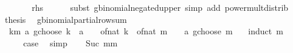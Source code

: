 \begin{isabellebody}
\ \ \isamarkupfalse%
\ \isamarkupfalse%
\ {\isachardoublequoteopen}{\isasymdots}\ {\isacharequal}{\kern0pt}\ {\isacharquery}{\kern0pt}rhs{\isachardoublequoteclose}\isanewline
\ \ \ \ \isamarkupfalse%
\ {\isacharparenleft}{\kern0pt}subst\ gbinomial{\isacharunderscore}{\kern0pt}negated{\isacharunderscore}{\kern0pt}upper{\isacharparenright}{\kern0pt}\ {\isacharparenleft}{\kern0pt}simp\ add{\isacharcolon}{\kern0pt}\ power{\isacharunderscore}{\kern0pt}mult{\isacharunderscore}{\kern0pt}distrib{\isacharparenright}{\kern0pt}\isanewline
\ \ \isamarkupfalse%
\ \isamarkupfalse%
\ {\isacharquery}{\kern0pt}thesis\ \isacommand{{\isachardot}{\kern0pt}}\isamarkupfalse%
\isanewline
{}\isamarkupfalse%
%
\endisatagproof
{\isafoldproof}%
%
\isadelimproof
\isanewline
%
\endisadelimproof
\isanewline
{}\isamarkupfalse%
\ gbinomial{\isacharunderscore}{\kern0pt}partial{\isacharunderscore}{\kern0pt}row{\isacharunderscore}{\kern0pt}sum{\isacharcolon}{\kern0pt}\isanewline
\ \ {\isachardoublequoteopen}{\isacharparenleft}{\kern0pt}{\isasymSum}k{\isasymle}m{\isachardot}{\kern0pt}\ {\isacharparenleft}{\kern0pt}a\ gchoose\ k{\isacharparenright}{\kern0pt}\ {\isacharasterisk}{\kern0pt}\ {\isacharparenleft}{\kern0pt}{\isacharparenleft}{\kern0pt}a\ {\isacharslash}{\kern0pt}\ {}{\isacharparenright}{\kern0pt}\ {\isacharminus}{\kern0pt}\ of{\isacharunderscore}{\kern0pt}nat\ k{\isacharparenright}{\kern0pt}{\isacharparenright}{\kern0pt}\ {\isacharequal}{\kern0pt}\ {\isacharparenleft}{\kern0pt}{\isacharparenleft}{\kern0pt}of{\isacharunderscore}{\kern0pt}nat\ m\ {\isacharplus}{\kern0pt}\ {}{\isacharparenright}{\kern0pt}{\isacharslash}{\kern0pt}{}{\isacharparenright}{\kern0pt}\ {\isacharasterisk}{\kern0pt}\ {\isacharparenleft}{\kern0pt}a\ gchoose\ {\isacharparenleft}{\kern0pt}m\ {\isacharplus}{\kern0pt}\ {}{\isacharparenright}{\kern0pt}{\isacharparenright}{\kern0pt}{\isachardoublequoteclose}\isanewline
%
\isadelimproof
%
\endisadelimproof
%
\isatagproof
{}\isamarkupfalse%
\ {\isacharparenleft}{\kern0pt}induct\ m{\isacharparenright}{\kern0pt}\isanewline
\ \ \isamarkupfalse%
\ {}\isanewline
\ \ \isamarkupfalse%
\ \isamarkupfalse%
\ {\isacharquery}{\kern0pt}case\ \isamarkupfalse%
\ simp\isanewline
{}\isamarkupfalse%
\isanewline
\ \ \isamarkupfalse%
\ {\isacharparenleft}{\kern0pt}Suc\ mm{\isacharparenright}{\kern0pt}\isanewline

\end{isabellebody}
